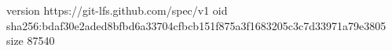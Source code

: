 version https://git-lfs.github.com/spec/v1
oid sha256:bdaf30e2aded8bfbd6a33704cfbcb151f875a3f1683205c3c7d33971a79e3805
size 87540
